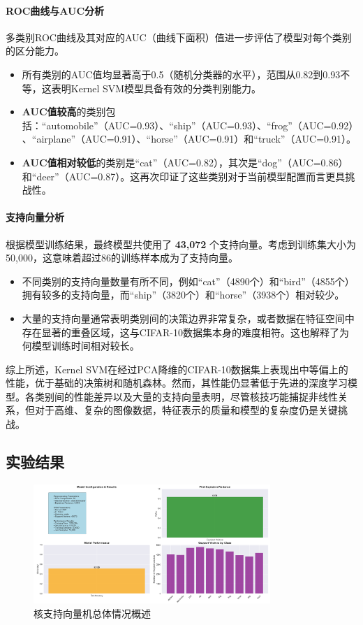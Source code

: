 \documentclass[UTF8]{report}
\theoremstyle{MyLineTheoremStyle} %
\theoremstyle{MyBlockTheoremStyle} %
\theoremstyle{MySubsubsectionStyle} %
\begin{document}
\paragraph{ROC曲线与AUC分析}
多类别ROC曲线及其对应的AUC（曲线下面积）值进一步评估了模型对每个类别的区分能力。
\begin{itemize}
    \item 所有类别的AUC值均显著高于0.5（随机分类器的水平），范围从0.82到0.93不等，这表明Kernel SVM模型具备有效的分类判别能力。
    \item \textbf{AUC值较高}的类别包括：“automobile”（AUC=0.93）、“ship”（AUC=0.93）、“frog”（AUC=0.92）、“airplane”（AUC=0.91）、“horse”（AUC=0.91）和“truck”（AUC=0.91）。
    \item \textbf{AUC值相对较低}的类别是“cat”（AUC=0.82），其次是“dog”（AUC=0.86）和“deer”（AUC=0.87）。这再次印证了这些类别对于当前模型配置而言更具挑战性。
\end{itemize}

\paragraph{支持向量分析}
根据模型训练结果，最终模型共使用了 \textbf{43,072} 个支持向量。考虑到训练集大小为50,000，这意味着超过86的训练样本成为了支持向量。
\begin{itemize}
    \item 不同类别的支持向量数量有所不同，例如“cat”（4890个）和“bird”（4855个）拥有较多的支持向量，而“ship”（3820个）和“horse”（3938个）相对较少。
    \item 大量的支持向量通常表明类别间的决策边界非常复杂，或者数据在特征空间中存在显著的重叠区域，这与CIFAR-10数据集本身的难度相符。这也解释了为何模型训练时间相对较长。
\end{itemize}

综上所述，Kernel SVM在经过PCA降维的CIFAR-10数据集上表现出中等偏上的性能，优于基础的决策树和随机森林。然而，其性能仍显著低于先进的深度学习模型。各类别间的性能差异以及大量的支持向量表明，尽管核技巧能捕捉非线性关系，但对于高维、复杂的图像数据，特征表示的质量和模型的复杂度仍是关键挑战。

\subsection{实验结果}

\begin{figure}[H]
    \centering
    \includegraphics[width=0.8\textwidth]{svm_per.png}
    \caption{核支持向量机总体情况概述}
    \label{fig:svm_performance}
\end{figure}
\end{document}

